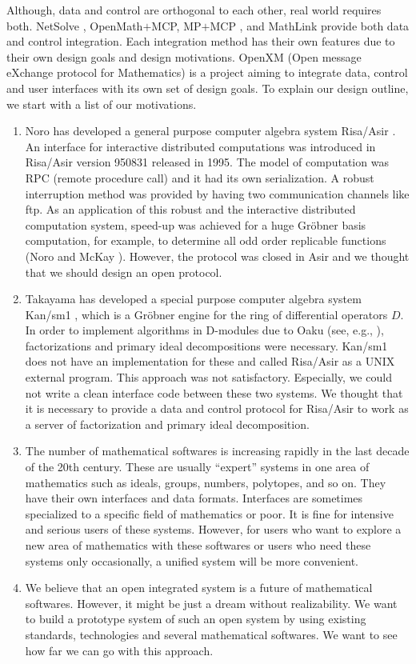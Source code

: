 Although, data and control are orthogonal to each other,
real world requires both.
NetSolve \cite{netsolve}, OpenMath$+$MCP, MP$+$MCP \cite{iamc},
and MathLink \cite{mathlink} provide both data and control integration.
Each integration method has their own features due to their
own design goals and design motivations.
OpenXM (Open message eXchange protocol for Mathematics)
is a project aiming to integrate data, control and user interfaces
with its own set of design goals.
To explain our design outline, we start with a list of
our motivations.
\begin{enumerate}
\item Noro has developed a general
purpose computer algebra system Risa/Asir \cite{asir}.
An interface for interactive distributed computations was introduced
in Risa/Asir version 950831 released in 1995.
The model of computation was RPC (remote procedure call)
and it had its own serialization.
A robust interruption method was provided by having two communication channels
like ftp.
As an application of this robust and the interactive distributed computation
system, speed-up was achieved for a huge Gr\"obner basis computation,
for example,
to determine all odd order replicable functions 
(Noro and McKay \cite{noro-mckay}).
However, the protocol was closed in Asir and we thought that we should
design an open protocol.
\item Takayama has developed
a special purpose computer algebra system Kan/sm1 \cite{kan},
which is a Gr\"obner engine for the ring of differential operators $D$. 
In order to implement algorithms in D-modules due to Oaku 
(see, e.g., \cite{sst-book}),
factorizations and primary ideal decompositions were necessary.
Kan/sm1 does not have an implementation for these and called
Risa/Asir as a UNIX external program.
This approach was not satisfactory.
Especially, we could not write a clean interface code between these
two systems.
We thought that it is necessary to provide a data and control protocol
for Risa/Asir to work as a server of factorization and primary ideal
decomposition.
\item The number of mathematical softwares is increasing rapidly in the last
decade of the 20th century.
These are usually ``expert'' systems in one area of mathematics
such as ideals, groups, numbers, polytopes, and so on.
They have their own interfaces and data formats.
Interfaces are sometimes specialized to a specific field of mathematics
or poor.
It is fine for intensive and serious users of these systems.
However, for users who want to explore a new area of mathematics with these
softwares or users who need these systems only occasionally,
a unified system will be more convenient.

\item  We believe that an open integrated system is a future of mathematical
softwares.
However, it might be just a dream without realizability.
We want to build a prototype system of such an open system by using
existing standards, technologies and several mathematical softwares.
We want to see how far we can go with this approach.
\end{enumerate}

